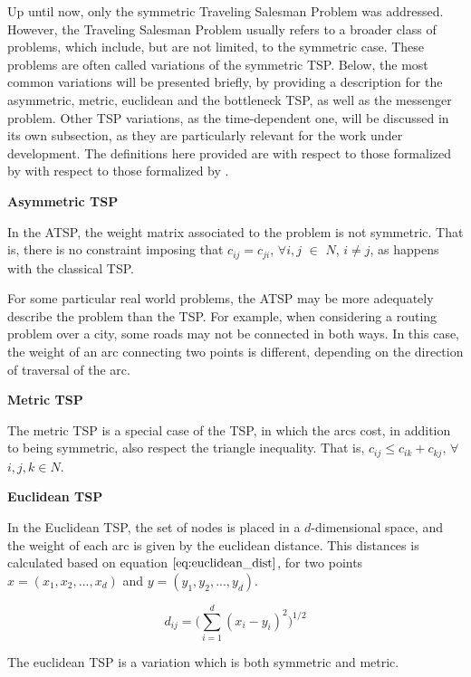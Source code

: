 Up until now, only the symmetric Traveling Salesman Problem was addressed. However, the Traveling Salesman Problem usually refers to a broader class of problems, which include, but are not limited, to the symmetric case. These problems are often called variations of the symmetric TSP. Below, the most common variations will be presented briefly, by providing a description for the asymmetric, metric, euclidean and the bottleneck TSP, as well as the messenger problem. %
Other TSP variations, as the time-dependent one, will be discussed in its own subsection, as they are particularly relevant for the work under development. The definitions here provided are with respect to those formalized by with respect to those formalized by \cite{tsp_book}.

\textbf{Asymmetric TSP}

In the \ac{ATSP}, the weight matrix associated to the problem is not symmetric. That is, there is no constraint imposing that $c_{ij} = c_{ji}$, $\forall i, j$ $\in$ $N$, $i \ne j$, as happens with the classical TSP.

For some particular real world problems, the ATSP may be more adequately describe the problem than the TSP. For example, when considering a routing problem over a city, some roads may not be connected in both ways. In this case, the weight of an arc connecting two points is different, depending on the direction of traversal of the arc.


\textbf{Metric TSP}

The metric TSP is a special case of the TSP, in which the arcs cost,
in addition to being symmetric, also respect the triangle inequality. That is,
$c_{ij} \leq c_{ik} + c_{kj}$, $\forall$ $i, j, k \in N$.


\textbf{Euclidean TSP}

In the Euclidean TSP, the set of nodes is placed in a $d$-dimensional space,
and the weight of each arc is given by the euclidean distance. This distances is
calculated based on equation $\ref{eq:euclidean_dist}$, for two points
$x = (x_{1}, x_{2}, ..., x_{d})$ and $y = (y_{1}, y_{2}, ..., y_{d})$.

\begin{equation}
\label{eq:euclidean_dist}
  d_{ij} = \bigg( \sum_{i=1}^{d} (x_{i}-y_{i})^2\bigg)^{1/2}
\end{equation}

The euclidean TSP is a variation which is both symmetric and metric.


